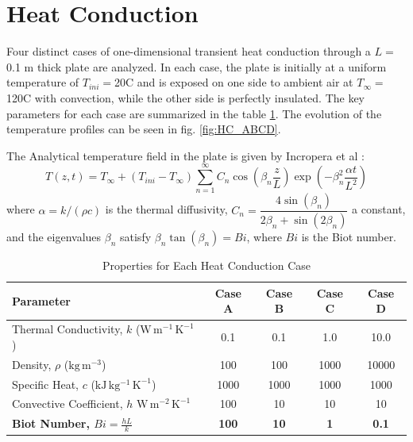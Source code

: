 \documentclass[12pt]{article}
\begin{document}
\fi

\section{Heat Conduction} 
Four distinct cases of one-dimensional transient heat conduction through a $L=$0.1 m thick plate are analyzed. In each case, the plate is initially at a uniform temperature of $T_{ini}=$20\textdegree{}C and is exposed on one side to ambient air at $T_\infty=$120\textdegree{}C with convection, while the other side is perfectly insulated. The key parameters for each case are summarized in the table \ref{tab:cases_properties}. The evolution of the temperature profiles can be seen in fig. \ref{fig:HC_ABCD}.


The Analytical temperature field in the plate is given by Incropera et al \cite{incropera_fundamentals_2007}:
\begin{equation}
T(z,t) = T_\infty + (T_{ini} - T_\infty)\sum_{n=1}^{\infty} C_n \cos\!\left(\beta_n \frac{z}{L}\right)
\exp\!\left(-\beta_n^2 \frac{\alpha t}{L^2}\right)
\label{Eq:Thermal_thranscendantale}
\end{equation}
where $\alpha = k/(\rho c)$ is the thermal diffusivity, $C_n = \dfrac{4\sin(\beta_n)}{2\beta_n + \sin(2\beta_n)}$ a constant, and the eigenvalues $\beta_n$ satisfy $\beta_n \tan(\beta_n) = Bi$, where $Bi$ is the Biot number.

\vspace{-0.5cm}

\begin{table}[H]
\centering
\caption{Properties for Each Heat Conduction Case}
\label{tab:cases_properties}
\begin{tabular}{|l|c|c|c|c|}
\hline
\textbf{Parameter} & \textbf{Case A} & \textbf{Case B} & \textbf{Case C} & \textbf{Case D} \\ \hline
Thermal Conductivity, $k$ ($\mathrm{W\,m^{-1}\,K^{-1}}$) & 0.1 & 0.1 & 1.0 & 10.0 \\
Density, $\rho$ ($\mathrm{kg\,m^{-3}}$) & 100 & 100 & 1000 & 10000 \\
Specific Heat, $c$ ($\mathrm{kJ\,kg^{-1}\,K^{-1}}$) & 1000 & 1000 & 1000 & 1000 \\
Convective Coefficient, $h$ $\mathrm{W\,m^{-2}\,K^{-1}}$  & 100 & 10 & 10 & 10 \\ \hline
\textbf{Biot Number, $Bi = \frac{hL}{k}$} & \textbf{100} & \textbf{10} & \textbf{1} & \textbf{0.1} \\ \hline
\end{tabular}
\end{table}
\end{document}
